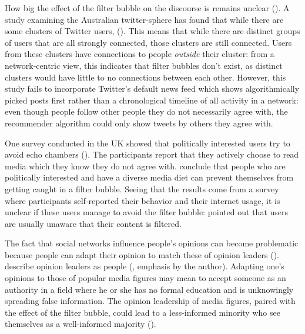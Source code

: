 How big the effect of the filter bubble on the discourse is remains unclear (\cite{brunsEchoChamberWhat2017}). A study examining the Australian twitter-sphere has found that while there are some clusters of Twitter users,  (\cite[9]{brunsEchoChamberWhat2017}). This means that while there are distinct groups of users that are all strongly connected, those clusters are still connected. Users from these clusters have connections to people \emph{outside} their cluster: from a network-centric view, this indicates that filter bubbles don't exist, as distinct clusters would have little to no connections between each other. However, this study fails to incorporate Twitter's default news feed which shows algorithmically picked posts first rather than a chronological timeline of all activity in a network: even though people follow other people they do not necessarily agree with, the recommender algorithm could only show tweets by others they agree with.

One survey conducted in the UK showed that politically interested users try to avoid echo chambers (\cite{duboisEchoChamberOverstated2018}). The participants report that they actively choose to read media which they know they do not agree with. \citeauthor{duboisEchoChamberOverstated2018} conclude that people who are politically interested and have a diverse media diet can prevent themselves from getting caught in a filter bubble. Seeing that the results come from a survey where participants self-reported their behavior and their internet usage, it is unclear if these users manage to avoid the filter bubble: \citeauthor{bozdagBreakingFilterBubble2015} pointed out that users are usually unaware that their content is filtered. 

The fact that social networks influence people's opinions can become problematic because people can adapt their opinion to match these of opinion leaders (\cite{altafiniDynamicsOpinionForming2012}). \citeauthor{gokceTwitterPoliticsIdentifying2014} describe opinion leaders as people  (\cite[673]{gokceTwitterPoliticsIdentifying2014}, emphasis by the author). Adapting one's opinions to those of popular media figures may mean to accept someone as an authority in a field where he or she has no formal education and is unknowingly spreading false information. The opinion leadership of media figures, paired with the effect of the filter bubble, could lead to a less-informed minority who see themselves as a well-informed majority (\cite{moscoviciSilentMajoritiesLoud1991}).

